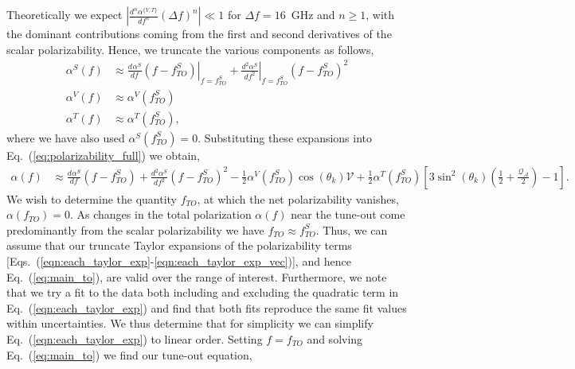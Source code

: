 \documentclass{article}
\newcommand{\difn}[3]{\frac{d^#3 #1}{d #2^#3}}
\newcommand{\derivn}[3][{}]{
    \frac{d^{#1} #2}{d #3^{#1}}
}
\begin{document}
Theoretically we expect \(\left|\difn{\alpha^{\{V,T\}}}{f}{n} (\Delta f)^n\right|\ll 1\) for \(\Delta f = 16\)~GHz and \(n\geq1\), with the dominant contributions coming from the first and second derivatives of the scalar polarizability. Hence, we truncate the various components as follows,
\begin{align}
    \alpha^S(f) &\approx \left. \derivn{\alpha^S}{f}{{}}(f-f^{S}_{TO})\right|_{f=f^{S}_{TO}} +\left. \difn{\alpha^S}{f}{2}\right|_{f=f^{S}_{TO}}(f-f^{S}_{TO})^2 \label{eqn:each_taylor_exp}\\
    \alpha^V(f) &\approx  \alpha^V(f^{S}_{TO}) \\
    \alpha^T(f) &\approx  \alpha^T(f^{S}_{TO}),\label{eqn:each_taylor_exp_vec}
\end{align}
where we have also used \( \alpha^S(f^{S}_{TO})=0\). Substituting these expansions into Eq.~(\ref{eq:polarizability_full}) we obtain,
\begin{align}
    \alpha(f) &\approx \derivn{\alpha^S}{f}{{}}(f-f^{S}_{TO}) + \difn{\alpha^S}{f}{2} (f-f^{S}_{TO})^2
    -\frac{1}{2} \alpha^V(f^{S}_{TO}) \cos \left( \theta_k \right) \mathcal{V}  + 
    \frac{1}{2} \alpha^T(f^{S}_{TO}) \left[3 \sin^2\left( \theta_k \right) \left(\frac{1}{2} +  \frac{\mathcal{Q_{A}}}{2}\right) -1 \right]  . \label{eq:main_to}
\end{align}
We wish to determine the quantity \(f_{TO}\), at which the net polarizability vanishes, \(\alpha(f_{TO})=0\). As changes in the total polarization \(\alpha(f)\) near the tune-out come predominantly from the scalar polarizability we have \(f_{TO}\approx f^{S}_{TO}\). Thus, we can assume that our truncate Taylor expansions of the polarizability terms [Eqs.~(\ref{eqn:each_taylor_exp}-\ref{eqn:each_taylor_exp_vec})], and hence Eq.~(\ref{eq:main_to}), are valid over the range of interest. Furthermore, we note that we try a fit to the data both including and excluding the quadratic term in Eq.~(\ref{eqn:each_taylor_exp}) and find that both fits reproduce the same fit values within uncertainties. We thus determine that for simplicity we can simplify Eq.~(\ref{eqn:each_taylor_exp}) to linear order. Setting \(f=f_{TO}\) and solving Eq.~(\ref{eq:main_to}) we find our tune-out equation, 
\end{document}
